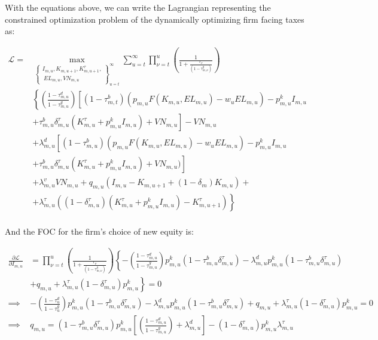 \documentclass[letterpaper,12pt]{article}
\theoremstyle{definition}
\begin{document}
\begin{spacing}{1.5}
With the equations above, we can write the Lagrangian representing the constrained optimization problem of the dynamically optimizing firm facing taxes as: 

\begin{equation}
\label{eqn:firm_lagrange_tax2}
\begin{split}
\mathcal{L} = &  \max_{\left\{\substack{I_{m,u},K_{m,u+1},K^{\tau}_{m,u+1},\\\ EL_{m,u},VN_{m,u}}\right\}_{u=t}^{\infty}} \sum_{u=t}^{\infty} \prod_{\nu=t}^{u} \left(\frac{1}{1+\frac{r_{v}}{(1-\tau^{g}_{m,\nu})}}\right)\\
& \left\{ \left(\frac{1-\tau^{d}_{m,u}}{1-\tau^{g}_{m,u}}\right) \left[(1-\tau^{b}_{m,t})\left(p_{m,u}F(K_{m,u},EL_{m,u}) - w_{u}EL_{m,u}\right) -p^{k}_{m,u}I_{m,u}   \right. \right.\\
       & \left.\left. + \tau^{b}_{m,u}\delta^{\tau}_{m,u}(K^{\tau}_{m,u}+p^{k}_{m,u}I_{m,u}) +VN_{m,u}\right]  - VN_{m,u} \right. \\
       &+\left. \lambda^{d}_{m,u}\left[(1-\tau^{b}_{m,u})(p_{m,u}F(K_{m,u},EL_{m,u}) - w_{u}EL_{m,u}) -p^{k}_{m,u}I_{m,u} \right.\right. \\ 
       & \left.\left. + \tau^{b}_{m,u}\delta^{\tau}_{m,u}(K^{\tau}_{m,u}+p^{k}_{m,u}I_{m,u}) +VN_{m,u})\right] \right. \\
       &+ \left. \lambda^{v}_{m,u}VN_{m,u} + q_{m,u}(I_{m,u} - K_{m,u+1} +(1-\delta_{m})K_{m,u}) + \right. \\
       & +\left. \lambda^{\tau}_{m,u}((1-\delta^{\tau}_{m,u})(K^{\tau}_{m,u}+p^{k}_{m,u}I_{m,u}) - K^{\tau}_{m,u+1})\right\}  \\
\end{split}
\end{equation}

And the FOC for the firm's choice of new equity is:

\begin{equation}
\label{eqn:lagrange_foc_i_tax}
\begin{split}
 \frac{\partial \mathcal{L}}{\partial I_{m,u}} & =   \prod_{\nu=t}^{u} \left(\frac{1}{1+\frac{r_{\nu}}{(1-\tau^{g}_{m,\nu})}}\right) \left\{-\left(\frac{1-\tau^{d}_{m,u}}{1-\tau^{g}_{m,u}}\right)p^{k}_{m,u}(1-\tau^{b}_{m,u}\delta^{\tau}_{m,u}) - \lambda^{d}_{m,u}p^{k}_{m,u}(1-\tau^{b}_{m,u}\delta^{\tau}_{m,u}) \right. \\
 & \left. + q_{m,u}  + \lambda^{\tau}_{m,u}(1-\delta^{\tau}_{m,u})p^{k}_{m,u} \right\} = 0 \\
\implies &-\left(\frac{1-\tau^{d}_{u}}{1-\tau^{g}_{u}}\right)p^{k}_{m,u}(1-\tau^{b}_{m,u}\delta^{\tau}_{m,u}) - \lambda^{d}_{m,u}p^{k}_{m,u}(1-\tau^{b}_{m,u}\delta^{\tau}_{m,u}) + q_{m,u}  + \lambda^{\tau}_{m,u}(1-\delta^{\tau}_{m,u})p^{k}_{m,u}  = 0 \\
\implies &  q_{m,u} = (1-\tau^{b}_{m,u}\delta^{\tau}_{m,u})p^{k}_{m,u}\left[\left(\frac{1-\tau^{d}_{m,u}}{1-\tau^{g}_{m,u}}\right) + \lambda^{d}_{m,u}\right] - (1-\delta^{\tau}_{m,u})p^{k}_{m,u}\lambda^{\tau}_{m,u}   \\
\end{split}
\end{equation}



\end{spacing}
\end{document}
